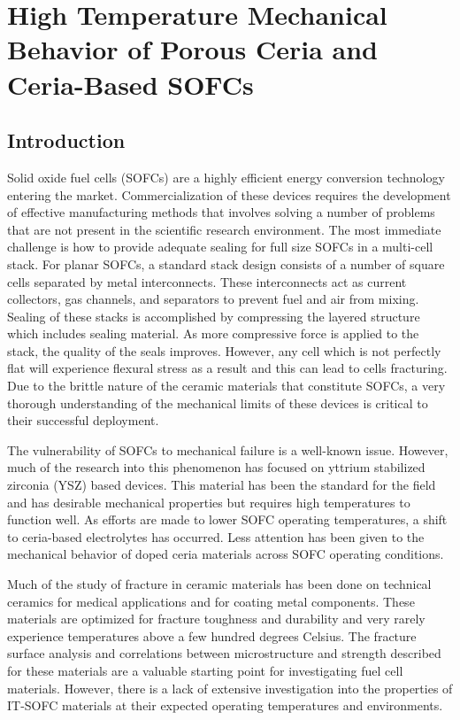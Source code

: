 


\chapter{High Temperature Mechanical Behavior of Porous Ceria and Ceria-Based SOFCs}

\section{Introduction}
Solid oxide fuel cells (SOFCs) are a highly efficient energy conversion technology entering the market.
Commercialization of these devices requires the development of effective manufacturing methods that involves solving a number of problems that are not present in the scientific research environment.
The most immediate challenge is how to provide adequate sealing for full size SOFCs in a multi-cell stack.
For planar SOFCs, a standard stack design consists of a number of square cells separated by metal interconnects.\cite{Ki2010}
These interconnects act as current collectors, gas channels, and separators to prevent fuel and air from mixing.
Sealing of these stacks is accomplished by compressing the layered structure which includes sealing material.
As more compressive force is applied to the stack, the quality of the seals improves.
However, any cell which is not perfectly flat will experience flexural stress as a result and this can lead to cells fracturing.
Due to the brittle nature of the ceramic materials that constitute SOFCs, a very thorough understanding of the mechanical limits of these devices is critical to their successful deployment.

The vulnerability of SOFCs to mechanical failure is a well-known issue.
However, much of the research into this phenomenon has focused on yttrium stabilized zirconia (YSZ) based devices.\cite{Roa2011,Yu2007,Nakajo2012}
This material has been the standard for the field and has desirable mechanical properties but requires high temperatures to function well.
As efforts are made to lower SOFC operating temperatures, a shift to ceria-based electrolytes has occurred.
Less attention has been given to the mechanical behavior of doped ceria materials across SOFC operating conditions.

Much of the study of fracture in ceramic materials has been done on technical ceramics for medical applications and for coating metal components.\cite{Deng2004,Ambrozic2007,Yonezu2014,Meille2012,Nie2010,Olagnon1999,Sorensen2001,Barinov1997}
These materials are optimized for fracture toughness and durability and very rarely experience temperatures above a few hundred degrees Celsius.
The fracture surface analysis and correlations between microstructure and strength described for these materials are a valuable starting point for investigating fuel cell materials.
However, there is a lack of extensive investigation into the properties of IT-SOFC materials at their expected operating temperatures and environments.

